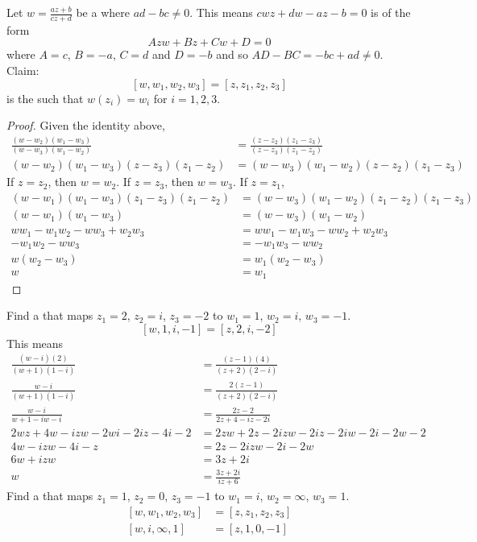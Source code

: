 \documentclass[12pt]{article}
\begin{document}
Let $w = \frac{az+b}{cz+d}$ be a \mobt where $ad - bc \neq 0$. This means $cwz + dw - az - b = 0$ is of the form $$Azw + Bz + Cw + D = 0 $$ where $A = c$, $B = -a$, $C = d$ and $D = -b$ and so $AD-BC = -bc+ad \neq 0$. \\
Claim: $$[w,w_1,w_2,w_3] = [z,z_1,z_2,z_3]$$ is the \mobt such that $w(z_i) = w_i$ for $i=1,2,3$. 
\begin{proof} Given the identity above, $$ \begin{aligned} \frac{(w-w_2)(w_1-w_3)}{(w-w_3)(w_1-w_2)} &= \frac{(z-z_2)(z_1-z_3)}{(z-z_3)(z_1-z_2)} \\ (w-w_2)(w_1-w_3)(z-z_3)(z_1-z_2) &= (w-w_3)(w_1- w_2)(z-z_2)(z_1-z_3) \end{aligned} $$ 
If $z=z_2$, then $w = w_2$. If $z = z_3$, then $w = w_3$. If $z = z_1$, $$ \begin{aligned} 
(w-w_1)(w_1-w_3)(z_1-z_3)(z_1-z_2) &= (w-w_3)(w_1-w_2)(z_1-z_2)(z_1-z_3) \\ (w-w_1)(w_1-w_3) &= (w-w_3)(w_1-w_2) \\ ww_1 - w_1w_2 - ww_3 + w_2w_3 &= ww_1 - w_1w_3 - ww_2 + w_2w_3 \\ -w_1w_2 - ww_3 &= -w_1w_3 - ww_2 \\ w(w_2 - w_3) &= w_1(w_2-w_3) \\ w&=w_1 \end{aligned} $$ \end{proof} 
Find a \mobt that maps $z_1=2$, $z_2=i$, $z_3 = -2$ to $w_1=1$, $w_2 = i$, $w_3 = -1$. 
$$[w,1,i,-1] = [z,2,i,-2]$$ This means $$ \begin{aligned} 
\frac{(w-i)(2)}{(w+1)(1-i)} &= \frac{(z-1)(4)}{(z+2)(2-i)} \\ \frac{w-i}{(w+1)(1-i)} &= \frac{2(z-1)}{(z+2)(2-i)} \\ \frac{w-i}{w+1-iw -i} &= \frac{2z-2}{2z + 4 - iz - 2i} \\ 2wz + 4w - izw - 2wi - 2iz - 4i - 2 &= 2zw + 2z - 2izw - 2iz - 2iw - 2i - 2w - 2 \\ 4w - izw - 4i - z &= 2z - 2izw - 2i - 2w \\ 6w + izw &= 3z+2i \\ w &= \frac{3z + 2i}{iz+6} \end{aligned} $$ 
Find a \mobt that maps $z_1=1$, $z_2 = 0$, $z_3 = -1$ to $w_1 = i$, $w_2 = \infty$, $w_3 = 1$. 
$$ \begin{aligned} [w,w_1,w_2,w_3] &= [z,z_1,z_2,z_3] \\ [w,i,\infty,1] &= [z,1,0,-1] \end{aligned} $$ 
\end{document}
